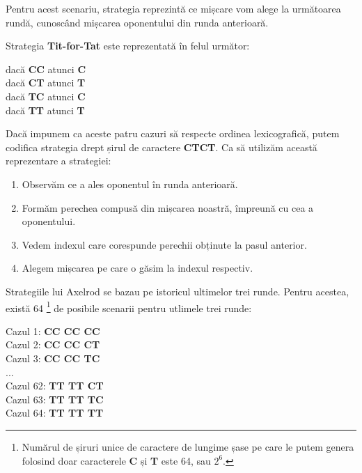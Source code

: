 Pentru acest scenariu, strategia reprezintă ce mișcare vom alege la următoarea rundă, cunoscând mișcarea oponentului din runda anterioară.

Strategia \textbf{Tit-for-Tat} este reprezentată în felul următor: 
\begin{center}
	dacă \textbf{CC} atunci \textbf{C}\\
	dacă \textbf{CT} atunci \textbf{T}\\
	dacă \textbf{TC} atunci \textbf{C}\\
	dacă \textbf{TT} atunci \textbf{T}\\
\end{center}
Dacă impunem ca aceste patru cazuri să respecte ordinea lexicografică, putem codifica strategia drept șirul de caractere \textbf{CTCT}. Ca să utilizăm această reprezentare a strategiei:
\begin{enumerate}
	\item Observăm ce a ales oponentul în runda anterioară.
	\item Formăm perechea compusă din mișcarea noastră, împreună cu cea a oponentului.
	\item Vedem indexul care corespunde perechii obținute la pasul anterior.
	\item Alegem mișcarea pe care o găsim la indexul respectiv.
\end{enumerate}

Strategiile lui Axelrod se bazau pe istoricul ultimelor trei runde. Pentru acestea, există 64 \footnote{Numărul de șiruri unice de caractere de lungime șase pe care le putem genera folosind doar caracterele \textbf{C} și \textbf{T} este 64, sau $2^6$.} de posibile scenarii pentru utlimele trei runde: 
\begin{center}
	Cazul 1: \textbf{CC CC CC}\\
	Cazul 2: \textbf{CC CC CT}\\
	Cazul 3: \textbf{CC CC TC}\\
	...
	\\
	Cazul 62: \textbf{TT TT CT}\\
	Cazul 63: \textbf{TT TT TC}\\
	Cazul 64: \textbf{TT TT TT}\\
\end{center}

